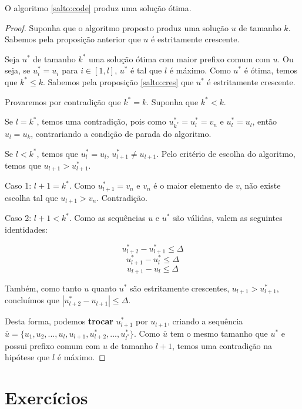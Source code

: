 \begin{theo} \label{salto:proof}
O algoritmo \ref{salto:code} produz uma solução ótima.
\end{theo}
\begin{proof}

Suponha que o algoritmo proposto produz uma solução $u$ de tamanho $k$. Sabemos pela proposição anterior que $u$ é estritamente crescente.

Seja $u^*$ de tamanho $k^*$ uma solução ótima com maior prefixo comum com $u$. Ou seja, se $u^*_i = u_i$ para $i \in [1, l]$, $u^*$ é tal que $l$ é máximo. Como $u^*$ é ótima, temos que $k^* \leq k$. Sabemos pela proposição \ref{salto:cres} que $u^*$ é estritamente crescente.

Provaremos por contradição que $k^* = k$.  Suponha que $k^* < k$.

Se $l = k^*$, temos uma contradição, pois como $u^*_{k^*} = u^*_l = v_n$ e $u^*_l = u_l$, então $u_l = u_k$, contrariando a condição de parada do algoritmo. 

Se $l < k^*$, temos que $u^*_{l} = u_{l}$, $u^*_{l + 1} \neq u_{l + 1}$. Pelo critério de escolha do algoritmo, temos que $u_{l + 1} > u^*_{l + 1}$.

Caso 1: $l + 1 = k^*$. Como $u^*_{l + 1} = v_n$ e $v_n$ é o maior elemento de $v$, não existe escolha tal que $u_{l + 1} > v_n$. Contradição.

Caso 2: $l + 1 < k^*$. Como as sequências $u$ e $u^*$ são válidas, valem as seguintes identidades:

$$u^*_{l + 2} - u^*_{l + 1} \leq \Delta$$
$$u^*_{l + 1} - u^*_{l} \leq \Delta$$
$$u_{l + 1} - u_{l} \leq \Delta$$

Também, como tanto $u$ quanto $u^*$ são estritamente crescentes, $u_{l + 1} > u^*_{l + 1}$, concluímos que $|u^*_{l + 2} - u_{l + 1}| \leq \Delta$.

Desta forma, podemos \textbf{trocar} $u^*_{l + 1}$ por $u_{l + 1}$, criando a sequência $\bar{u} = \{u_1, u_2, ..., u_l, u_{l + 1}, u^*_{l + 2}, ..., u^*_{l^*}\}$. Como $\bar{u}$ tem o mesmo tamanho que $u^*$ e possui prefixo comum com $u$ de tamanho $l + 1$, temos uma contradição na hipótese que $l$ é máximo.

\end{proof}

\section{Exercícios}

